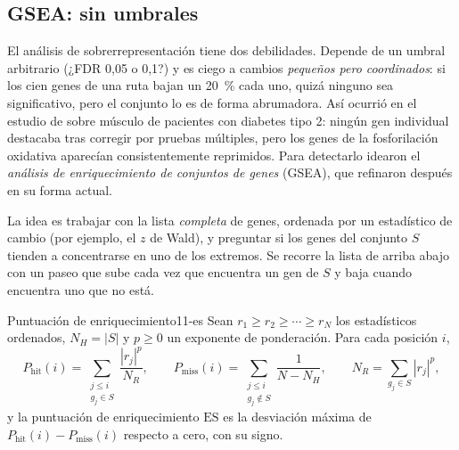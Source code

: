 \subsection{GSEA: sin umbrales}

El análisis de sobrerrepresentación tiene dos debilidades. Depende de un umbral arbitrario (¿FDR 0,05 o 0,1?) y es ciego a cambios \emph{pequeños pero coordinados}: si los cien genes de una ruta bajan un \SI{20}{\percent} cada uno, quizá ninguno sea significativo, pero el conjunto lo es de forma abrumadora. Así ocurrió en el estudio de \textcite{c11-mootha2003} sobre músculo de pacientes con diabetes tipo 2: ningún gen individual destacaba tras corregir por pruebas múltiples, pero los genes de la fosforilación oxidativa aparecían consistentemente reprimidos. Para detectarlo idearon el \emph{análisis de enriquecimiento de conjuntos de genes} (GSEA), que \textcite{c11-subramanian2005} refinaron después en su forma actual.

La idea es trabajar con la lista \emph{completa} de genes, ordenada por un estadístico de cambio (por ejemplo, el $z$ de Wald), y preguntar si los genes del conjunto $S$ tienden a concentrarse en uno de los extremos. Se recorre la lista de arriba abajo con un paseo que sube cada vez que encuentra un gen de $S$ y baja cuando encuentra uno que no está.

\begin{definicion}{Puntuación de enriquecimiento}{11-es}
Sean $r_1\ge r_2\ge\cdots\ge r_N$ los estadísticos ordenados, $N_H=|S|$ y $p\ge0$ un exponente de ponderación. Para cada posición $i$,
\begin{equation}\label{eq:11-gsea}
P_{\mathrm{hit}}(i)=\sum_{\substack{j\le i\\ g_j\in S}}\frac{|r_j|^{p}}{N_R},\qquad
P_{\mathrm{miss}}(i)=\sum_{\substack{j\le i\\ g_j\notin S}}\frac{1}{N-N_H},\qquad
N_R=\sum_{g_j\in S}|r_j|^{p},
\end{equation}
y la puntuación de enriquecimiento $\mathrm{ES}$ es la desviación máxima de $P_{\mathrm{hit}}(i)-P_{\mathrm{miss}}(i)$ respecto a cero, con su signo.
\end{definicion}

\begin{simbolos}
\end{simbolos}

